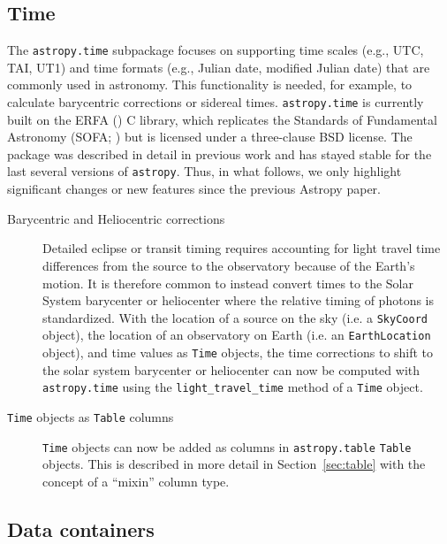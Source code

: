 \documentclass[modern]{aastex61}
\newcommand{\package}[1]{\texttt{#1}\xspace}
\newcommand{\astropy}{Astropy\xspace}
\newcommand{\astropypkg}{\package{astropy}}
\newcommand{\sectionname}{Section\xspace}
\begin{document}
\subsection{Time}
\label{sec:time}

The \package{astropy.time} subpackage focuses on supporting time scales (e.g.,
UTC, TAI, UT1) and time formats (e.g., Julian date, modified Julian date) that
are commonly used in astronomy.
This functionality is needed, for example, to calculate barycentric corrections
or sidereal times.
\package{astropy.time} is currently built on the ERFA (\citealt{erfa}) C
library, which replicates the Standards of Fundamental Astronomy (SOFA;
\citealt{sofa}) but is licensed under a three-clause BSD license.
The package was described in detail in previous work \citep{astropy} and has
stayed stable for the last several versions of \astropypkg.
Thus, in what follows, we only highlight significant changes or new features
since the previous \astropy paper.

\begin{description}
    \item[Barycentric and Heliocentric corrections] Detailed eclipse or transit
        timing requires accounting for light travel time differences from the
        source to the observatory because of the Earth's motion.
        It is therefore common to instead convert times to the Solar System
        barycenter or heliocenter where the relative timing of photons is
        standardized.
        With the location of a source on the sky (i.e. a \texttt{SkyCoord}
        object), the location of an observatory on Earth (i.e. an
        \texttt{EarthLocation} object), and time values as \texttt{Time}
        objects, the time corrections to shift to the solar system barycenter or
        heliocenter can now be computed with \package{astropy.time} using the
        \texttt{light\_travel\_time} method of a \texttt{Time} object.
    \item[\texttt{Time} objects as \texttt{Table} columns] \texttt{Time} objects
        can now be added as columns in \package{astropy.table} \texttt{Table}
        objects. This is described in more detail in
        \sectionname~\ref{sec:table} with the concept of a ``mixin'' column
        type.
\end{description}

\subsection{Data containers}
\end{document}

